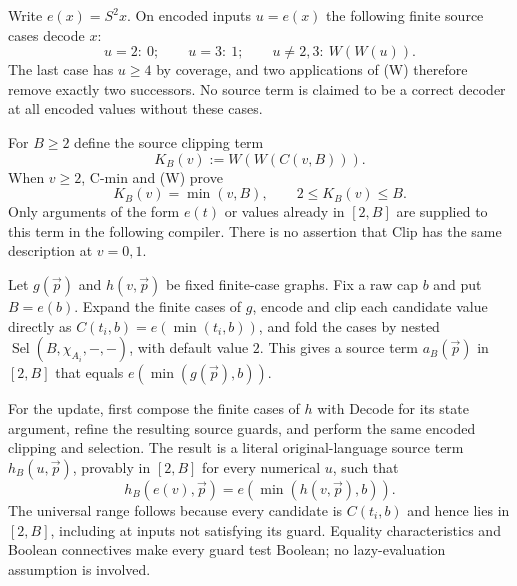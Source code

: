 \documentclass[11pt,letterpaper]{article}
\theoremstyle{definition}\newtheorem{definition}[theorem]{Definition}
\theoremstyle{remark}\newtheorem{remark}[theorem]{Remark}
\begin{document}
Write $e(x)=S^2x$. On encoded inputs $u=e(x)$ the following finite
source cases decode $x$:
\[
 u=2:\ 0;\qquad u=3:\ 1;\qquad u\ne2,3:\ W(W(u)).
 \tag{Decode}
\]
The last case has $u\ge4$ by coverage, and two applications of (W)
therefore remove exactly two successors. No source term is claimed
to be a correct decoder at all encoded values without these cases.

For $B\ge2$ define the source clipping term
\[
                    K_B(v):=W(W(C(v,B))).
\]
When $v\ge2$, C-min and (W) prove
\[
             K_B(v)=\min(v,B),\qquad 2\le K_B(v)\le B.
 \tag{Clip}
\]
Only arguments of the form $e(t)$ or values already in $[2,B]$
are supplied to this term in the following compiler. There is no
assertion that Clip has the same description at $v=0,1$.

Let $g(\vec p)$ and $h(v,\vec p)$ be fixed finite-case graphs. Fix a
raw cap $b$ and put $B=e(b)$. Expand the finite cases of $g$, encode
and clip each candidate value directly as $C(t_i,b)=e(\min(t_i,b))$, and fold the
cases by nested $\operatorname{Sel}(B,\chi_{A_i},-, -)$, with
default value $2$. This gives a source term $a_B(\vec p)$ in $[2,B]$
that equals $e(\min(g(\vec p),b))$.

For the update, first compose the finite cases of $h$ with Decode
for its state argument, refine the resulting source guards, and
perform the same encoded clipping and selection. The result is a
literal original-language source term $h_B(u,\vec p)$, provably
in $[2,B]$ for every numerical $u$, such that
\[
 h_B(e(v),\vec p)=e(\min(h(v,\vec p),b)).
 \tag{Compiled update}
\]
The universal range follows because every candidate is $C(t_i,b)$
and hence lies in $[2,B]$, including at inputs not satisfying its
guard. Equality characteristics and Boolean connectives make every
guard test Boolean; no lazy-evaluation assumption is involved.
\end{document}
